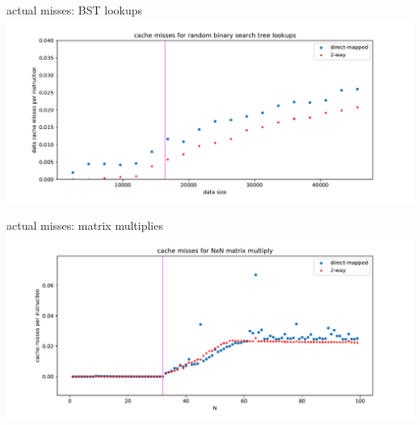 \begin{frame}{actual misses: BST lookups}
\includegraphics[width=\textwidth]{../caching/bst-both}
\end{frame}

\begin{frame}{actual misses: matrix multiplies}
\includegraphics[width=\textwidth]{../caching/mm-both}
\end{frame}
